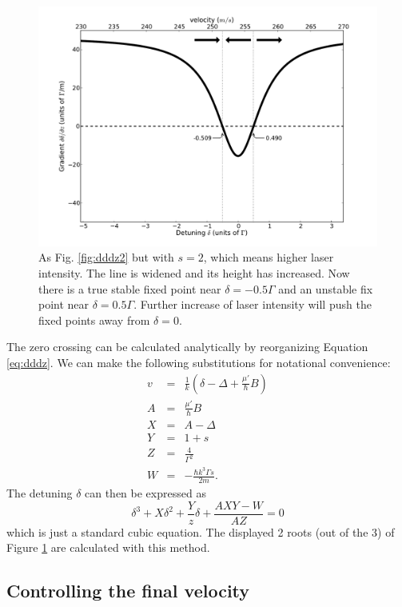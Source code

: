 \documentclass[12pt,a4paper]{article}
\begin{document}
\begin{figure}[htb]
\centering
\includegraphics[width=1.0\textwidth]{detu3}
\caption{As Fig. \ref{fig:dddz2} but with $s = 2$, which means higher laser intensity. The line is widened and its height has increased. Now there is a true stable fixed point near $\delta = -0.5 \Gamma$ and an unstable fix point near $\delta = 0.5 \Gamma$. Further increase of laser intensity will push the fixed points away from $\delta = 0$.}
\label{fig:dddz3}
\end{figure}

The zero crossing can be calculated analytically by reorganizing Equation \ref{eq:dddz}. We can make the following substitutions for notational convenience:
\begin{eqnarray}
v &=& \frac{1}{k}\left(\delta - \Delta + \frac{\mu'}{\hbar}B\right) \\
A &=& \frac{\mu'}{\hbar}B \\
X &=& A - \Delta \\
Y &=& 1+s \\
Z &=& \frac{4}{\Gamma^2} \\
W &=& - \frac{\hbar k^3 \Gamma s}{2 m}.
\end{eqnarray}
The detuning $\delta$ can then be expressed as
\begin{equation}
\delta^3 + X \delta^2 + \frac{Y}{z} \delta + \frac{A X Y - W}{A Z}= 0
\end{equation}
which is just a standard cubic equation. The displayed 2 roots (out of the 3) of Figure \ref{fig:dddz3} are calculated with this method.

\subsection{Controlling the final velocity}
\end{document}
